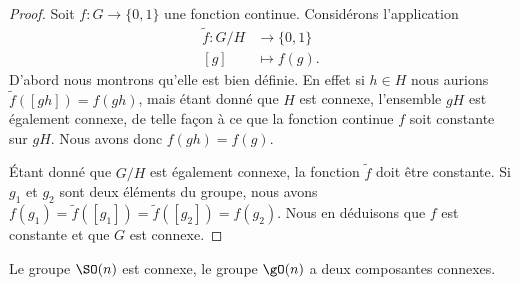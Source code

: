\begin{proof}
    Soit \( f\colon G\to \{ 0,1 \}\) une fonction continue. Considérons l'application
    \begin{equation}
        \begin{aligned}
            \tilde f\colon G/H&\to \{ 0,1 \} \\
            [g]&\mapsto f(g). 
        \end{aligned}
    \end{equation}
    D'abord nous montrons qu'elle est bien définie. En effet si \( h\in H\) nous aurions \( \tilde f([gh])=f(gh)\), mais étant donné que \( H\) est connexe, l'ensemble \( gH\) est également connexe, de telle façon à ce que la fonction continue \( f\) soit constante sur \( gH\). Nous avons donc \( f(gh)=f(g)\).

    Étant donné que \( G/H\) est également connexe, la fonction \( \tilde f\) doit être constante. Si \( g_1\) et \( g_2\) sont deux éléments du groupe, nous avons \( f(g_1)=\tilde f([g_1])=\tilde f([g_2])=f(g_2)\). Nous en déduisons que \( f\) est constante et que \( G\) est connexe.
\end{proof}

\begin{theorem}
    Le groupe \( \SO(n)\) est connexe, le groupe \( \gO(n)\) a deux composantes connexes.
\end{theorem}

